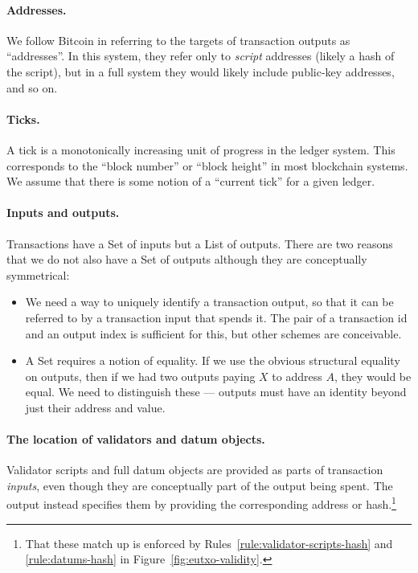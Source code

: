 \paragraph{Addresses.}
We follow Bitcoin in referring to the targets of transaction outputs as
``addresses''. In this system, they refer only to \emph{script} addresses
(likely a hash of the script), but in a full system they would likely include
public-key addresses, and so on.

\paragraph{Ticks.}
\label{para:ticks}
A tick is a monotonically increasing unit of progress in the
ledger system. This corresponds to the ``block number''
or ``block height'' in most blockchain systems. We assume that there is some
notion of a ``current tick'' for a given ledger.

\paragraph{Inputs and outputs.} Transactions have a
\textsf{Set} of inputs but a \textsf{List} of outputs. There
are two reasons that we do not also have a \textsf{Set} of outputs although they
are conceptually symmetrical:
\begin{itemize}
\item We need a way to uniquely identify a transaction output, so
  that it can be referred to by a transaction input that spends it. The pair of
  a transaction id and an output index is sufficient for this, but other schemes
  are conceivable.
\item A \textsf{Set} requires a notion of equality. If we use the
  obvious structural equality on outputs, then if we had two outputs
  paying $X$ to address $A$, they would be equal. We need to
  distinguish these --- outputs must have an identity beyond
  just their address and value.
\end{itemize}

\paragraph{The location of validators and datum objects.} Validator scripts
and full datum objects are provided as parts of transaction \emph{inputs},
even though they are conceptually part of the output being spent. The
output instead specifies them by providing the corresponding address
or hash.\footnote{That these match up is enforced by
  Rules~\ref{rule:validator-scripts-hash} and
  \ref{rule:datums-hash} in Figure~\ref{fig:eutxo-validity}.}

